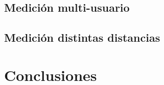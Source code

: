 


\subsection{Medición multi-usuario}
\subsection{Medición distintas distancias}

\section{Conclusiones}

